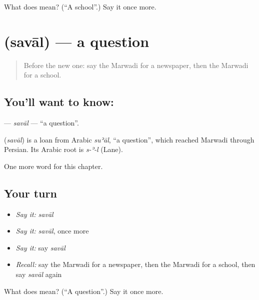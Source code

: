 \begin{tcolorbox}[breakable,colback=teal!4,colframe=teal!35!black,title={Before you move on}]
What does  mean? (\textquotedblleft{}A school\textquotedblright{}.) Say it once more.
\end{tcolorbox}
\section[\texorpdfstring{\mw{सवाल} (savāl)}{सवाल (savāl)}]{ (savāl) — a question}

\label{lesson:MW-C66-saval}



\begin{quote}
Before the new one: say the Marwadi for a newspaper, then the Marwadi for a school.
\end{quote}

\subsection*{You'll want to know: }
\textbf{} — \emph{savāl} — \textquotedblleft{}a question\textquotedblright{}.

\begin{cousinweb}
\textbf{} (\emph{savāl}) is a loan from Arabic \emph{suʾāl}, \textquotedblleft{}a question\textquotedblright{}, which reached Marwadi through Persian. Its Arabic root is \emph{s-ʾ-l} (Lane).
\end{cousinweb}

\begin{grammarlens}[title={What you've built}]
One more word for this chapter.
\end{grammarlens}

\subsection*{Your turn}
\begin{itemize}
\raggedright
  \item \emph{Say it:} \emph{savāl}
  \item \emph{Say it:} \emph{savāl}, once more
  \item \emph{Say it:} say \emph{savāl}
  \item \emph{Recall:} say the Marwadi for a newspaper, then the Marwadi for a school, then say \emph{savāl} again
\end{itemize}

\begin{tcolorbox}[breakable,colback=teal!4,colframe=teal!35!black,title={Before you move on}]
What does  mean? (\textquotedblleft{}A question\textquotedblright{}.) Say it once more.
\end{tcolorbox}
